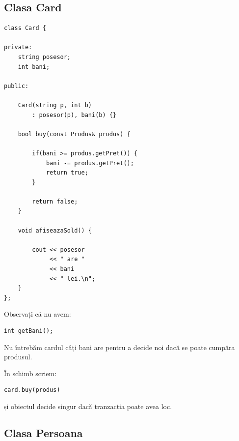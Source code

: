 \documentclass[12pt,a4paper]{article}
\begin{document}
\newpage
\subsection{Clasa Card}

\begin{lstlisting}
class Card {

private:
    string posesor;
    int bani;

public:

    Card(string p, int b)
        : posesor(p), bani(b) {}

    bool buy(const Produs& produs) {

        if(bani >= produs.getPret()) {
            bani -= produs.getPret();
            return true;
        }

        return false;
    }

    void afiseazaSold() {

        cout << posesor
             << " are "
             << bani
             << " lei.\n";
    }
};
\end{lstlisting}

Observați că nu avem:

\begin{lstlisting}
int getBani();
\end{lstlisting}

Nu întrebăm cardul câți bani are pentru a decide noi dacă se poate cumpăra produsul.

În schimb scriem:

\begin{lstlisting}
card.buy(produs)
\end{lstlisting}

și obiectul decide singur dacă tranzacția poate avea loc.

\newpage
\subsection{Clasa Persoana}
\end{document}
